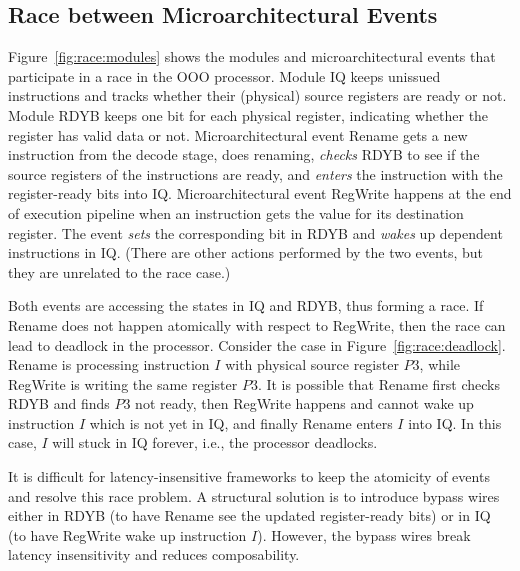 \documentclass[conference]{IEEEtran}
\begin{document}
\subsection{Race between Microarchitectural Events}\label{sec:cmd:iq}
Figure~\ref{fig:race:modules} shows the modules and microarchitectural events that participate in a race in the OOO processor.
Module IQ keeps unissued instructions and tracks whether their (physical) source registers are ready or not.
Module RDYB keeps one bit for each physical register, indicating whether the register has valid data or not.
Microarchitectural event {Rename} gets a new instruction from the decode stage, does renaming, \emph{checks} RDYB to see if the source registers of the instructions are ready, and \emph{enters} the instruction with the register-ready bits into IQ.
Microarchitectural event {RegWrite} happens at the end of execution pipeline when an instruction gets the value for its destination register.
The event \emph{sets} the corresponding bit in RDYB and \emph{wakes} up dependent instructions in IQ.
(There are other actions performed by the two events, but they are unrelated to the race case.)

Both events are accessing the states in IQ and RDYB, thus forming a race.
If Rename does not happen atomically with respect to RegWrite, then the race can lead to deadlock in the processor.
Consider the case in Figure~\ref{fig:race:deadlock}.
Rename is processing instruction $I$ with physical source register $P3$, while RegWrite is writing the same register $P3$.
It is possible that Rename first checks RDYB and finds $P3$ not ready, then RegWrite happens and cannot wake up instruction $I$ which is not yet in IQ, and finally Rename enters $I$ into IQ.
In this case, $I$ will stuck in IQ forever, i.e., the processor deadlocks.

It is difficult for latency-insensitive frameworks to keep the atomicity of events and resolve this race problem.
A structural solution is to introduce bypass wires either in RDYB (to have Rename see the updated register-ready bits) or in IQ (to have RegWrite wake up instruction $I$).
However, the bypass wires break latency insensitivity and reduces composability.
\end{document}

